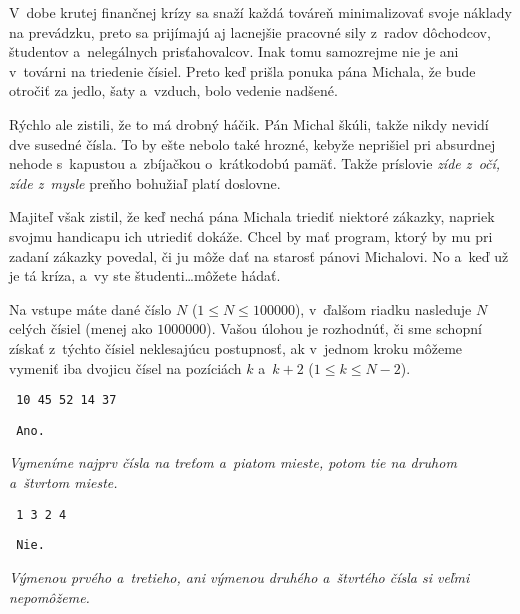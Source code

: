 



V~dobe krutej finančnej krízy sa snaží každá továreň minimalizovať svoje náklady na prevádzku,
preto sa prijímajú aj lacnejšie pracovné sily z~radov dôchodcov, študentov a~nelegálnych prisťahovalcov.
Inak tomu samozrejme nie je ani v~továrni na triedenie čísiel. Preto keď prišla ponuka pána Michala, že
bude otročiť za jedlo, šaty a~vzduch, bolo vedenie nadšené.

Rýchlo ale zistili, že to má drobný háčik. Pán
Michal škúli, takže nikdy nevidí dve susedné čísla. To by ešte nebolo také hrozné, kebyže neprišiel pri
absurdnej nehode s~kapustou a~zbíjačkou o~krátkodobú pamäť. Takže príslovie {\sl zíde z~očí,
zíde z~mysle} preňho bohužiaľ platí doslovne.

Majiteľ však zistil, že keď nechá pána Michala triediť niektoré
zákazky, napriek svojmu handicapu ich utriediť dokáže. Chcel by mať program, ktorý by mu pri zadaní zákazky
povedal, či ju môže dať na starosť pánovi Michalovi. No a~keď už je tá kríza, a~vy ste študenti\dots môžete hádať.

\uloha
Na vstupe máte dané číslo $N$ ($1 \leq N \leq 100000$), v~ďalšom riadku nasleduje $N$ celých čísiel (menej ako $1000000$). Vašou úlohou je rozhodnúť,
či sme schopní získať z~týchto čísiel neklesajúcu postupnosť, ak v~jednom kroku môžeme
vymeniť iba dvojicu čísel na pozíciách $k$ a~$k+2$ ($1 \leq k \leq N - 2$).

\priklad
\vstup\tt{}
10 45 52 14 37

\vystup\tt\obeylines
Ano.

{\sl Vymeníme najprv čísla na treťom a~piatom mieste, potom tie na druhom a~štvrtom mieste.}
\koniec



\priklad
\vstup\tt{}
1 3 2 4

\vystup\tt\obeylines
Nie.

{\sl Výmenou prvého a~tretieho, ani výmenou druhého a~štvrtého čísla si veľmi nepomôžeme.}
\koniec


